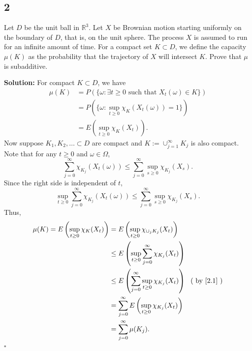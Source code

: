 \documentclass[12pt]{article}
\newcounter{ProofCounter}
\newenvironment{Solution}{\stepcounter{ProofCounter}\textbf{Solution:}}{\hfill$\square$}
\begin{document}

\subsection*{2}
\begin{tcolorbox}
  Let $D$ be the unit ball in $\mathbb{R}^3$. Let $X$ be Brownian motion starting uniformly on the boundary of $D$, that is, on the unit sphere. The process $X$ is assumed to run for an infinite amount of time. For a compact set $K \subset D$, we define the capacity $\mu(K)$ as the probability that the trajectory of $X$ will intersect $K$. Prove that $\mu$ is subadditive.
\end{tcolorbox}
\begin{Solution}
  For compact $K \subset D$, we have
  \begin{align*}
    \mu(K) & = P(\{ \omega : \exists t \geq 0 \text{ such that } X_t(\omega) \in K \}) \\
    & = P(\{ \omega : \sup_{t\geq 0} \chi_{K}(X_t(\omega)) = 1 \}) \\
    & = E\left( \sup_{t \geq 0} \chi_K(X_t) \right).
  \end{align*}
  Now suppose $K_1, K_2, \dots \subset D$ are compact and $K := \cup_{j=1}^{\infty} K_j$ is also compact. Note that for any $t \geq 0$ and $\omega \in \Omega$,
  \[
    \sum_{j=0}^{\infty} \chi_{K_j} (X_t(\omega)) \leq \sum_{j=0}^{\infty} \sup_{s \geq 0} \chi_{K_j}(X_s).
  \]
  Since the right side is independent of $t$,
  \begin{equation}
    \sup_{t\geq 0}\sum_{j=0}^{\infty} \chi_{K_j} (X_t(\omega)) \leq \sum_{j=0}^{\infty} \sup_{s \geq 0} \chi_{K_j}(X_s).
    \label{2.1}
  \end{equation}
  Thus,
  \begin{align*}
    \mu(K) = E\left( \sup_{t \geq 0} \chi_K(X_t) \right) & = E \left( \sup_{t\geq 0} \chi_{\cup_j K_j}(X_t) \right) \\
    & \leq E \left( \sup_{t \geq 0} \sum_{j=0}^{\infty} \chi_{K_j}(X_t) \right) \\
    & \leq E \left( \sum_{j=0}^{\infty} \sup_{t\geq 0} \chi_{K_j}(X_t) \right) \ \ \text{( by \eqref{2.1} )} \\
    & = \sum_{j=0}^{\infty} E \left( \sup_{t\geq 0} \chi_{K_j}(X_t) \right) \\
    & = \sum_{j=0}^{\infty} \mu(K_j).
    \end{align*}
\end{Solution}
\end{document}
